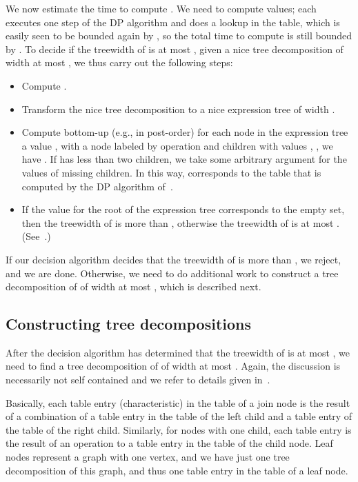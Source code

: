 \documentclass[a4paper,11pt]{article}
\theoremstyle{definition}
\theoremstyle{remark}
\begin{document}
We now estimate the time to compute .  We need to compute  values; each
executes one step of the DP algorithm and does a lookup in the table,
which is easily seen to be bounded again by , so the total time to compute  is still bounded by
.  To decide if the treewidth of  is
at most , given a nice tree decomposition of width at most ,
we thus carry out the following steps:
\begin{itemize}
\item Compute .
\item Transform the nice tree decomposition to a nice expression tree
  of width .
\item Compute bottom-up (e.g., in post-order) for each node  in the
  expression tree a value , with a node  labeled by operation
   and children with values , , we
  have .  If  has less than two
  children, we take some arbitrary argument for the values of missing
  children.  In this way,  corresponds to the table that is
  computed by the DP algorithm of~\cite{BodlaenderK96}.
\item If the value  for the root of the expression tree
  corresponds to the empty set, then the treewidth of  is more than
  , otherwise the treewidth of  is at most .
  (See~\cite[Section 4.6 and 5.6]{BodlaenderK96}.)
\end{itemize}

If our decision algorithm decides that the treewidth of  is more
than , we reject, and we are done.  Otherwise, we need to do
additional work to construct a tree decomposition of  of width at
most , which is described next.

\subsection{Constructing tree decompositions}
After the decision algorithm has determined that the treewidth of 
is at most , we need to find a tree decomposition of  of width
at most .  Again, the discussion is necessarily not self contained
and we refer to details given in~\cite[Chapter 6]{BodlaenderK96}.

Basically, each table entry (characteristic) in the table of a join
node is the result of a combination of a table entry in the table of
the left child and a table entry of the table of the right child.
Similarly, for nodes with one child, each table entry is the result of
an operation to a table entry in the table of the child node.  Leaf
nodes represent a graph with one vertex, and we have just one tree
decomposition of this graph, and thus one table entry in the table of
a leaf node.
\end{document}
